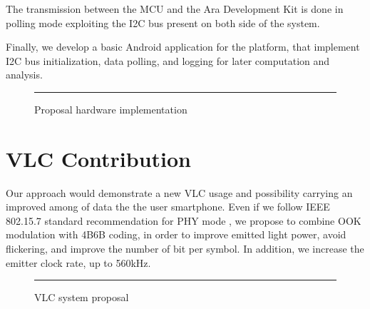 The transmission between the MCU and the Ara Development Kit is done in polling mode exploiting the I2C bus present on both side of the system. 

Finally, we develop a basic Android application for the platform, that implement I2C bus initialization, data polling, and logging for later computation and analysis.

\begin{figure}[htbp]
  \centering
    \rule{35em}{0.5pt}
  \caption[Proposal hardware implementation]{Proposal hardware implementation}
  \label{fig:RxCircuit}
\end{figure}



\section{VLC Contribution}

Our approach would demonstrate a new VLC usage and possibility carrying an improved among of data the the user smartphone. Even if we follow IEEE 802.15.7 standard recommendation for PHY mode , we propose to combine OOK modulation with 4B6B coding, in order to improve emitted light power, avoid flickering, and improve the number of bit per symbol. In addition, we increase the emitter clock rate, up to 560kHz.

\begin{figure}[htbp]
  \centering
    \rule{35em}{0.5pt}
  \caption[VLC system proposal]{VLC system proposal}
  \label{fig:RxCircuit}
\end{figure}


